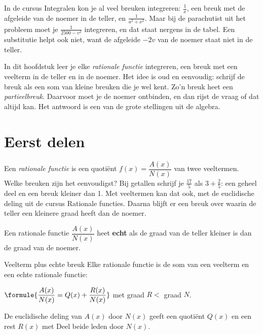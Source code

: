 In de cursus Integralen kon je al veel breuken integreren: $\tfrac{1}{x}$, een breuk met de afgeleide van de noemer in de teller, en $\tfrac{1}{a^2 + x^2}$. Maar bij de parachutist uit het probleem moet je $\tfrac{1}{2500 - v^2}$ integreren, en dat staat nergens in de tabel. Een substitutie helpt ook niet, want de afgeleide $-2v$ van de noemer staat niet in de teller.

In dit hoofdstuk leer je elke \textit{rationale functie} integreren, een breuk met een veelterm in de teller en in de noemer. Het idee is oud en eenvoudig: schrijf de breuk als een som van kleine breuken die je wel kent. Zo'n breuk heet een \textit{partieelbreuk}. Daarvoor moet je de noemer ontbinden, en dan rijst de vraag of dat altijd kan. Het antwoord is een van de grote stellingen uit de algebra.

\begin{oefeningen}[Start]

\end{oefeningen}


\section{Eerst delen}

Een \textit{rationale functie} is een quotiënt $f(x) = \dfrac{A(x)}{N(x)}$ van twee veeltermen. Welke breuken zijn het eenvoudigst? Bij getallen schrijf je $\tfrac{17}{5}$ als $3 + \tfrac25$: een geheel deel en een breuk kleiner dan 1. Met veeltermen kan dat ook, met de euclidische deling uit de cursus Rationale functies. Daarna blijft er een breuk over waarin de teller een kleinere graad heeft dan de noemer.

\begin{theorie}
Een rationale functie $\dfrac{A(x)}{N(x)}$ heet \textbf{\textcolor{accent}{echt}} als de graad van de teller kleiner is dan de graad van de noemer.

\begin{stelling}{Veelterm plus echte breuk}
Elke rationale functie is de som van een veelterm en een echte rationale functie:

\vspace{1mm}
\qquad $\formule{\dfrac{A(x)}{N(x)} = Q(x) + \dfrac{R(x)}{N(x)}}$ \quad met graad $R <$ graad $N$.
\end{stelling}

\begin{bewijs}
De euclidische deling van $A(x)$ door $N(x)$ geeft een quotiënt $Q(x)$ en een rest $R(x)$ met
Deel beide leden door $N(x)$.
\end{bewijs}
\end{theorie}

